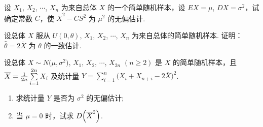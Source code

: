 	\begin{titwo}
		设 $X_{1}$, $X_{2}$, $\cdots$, $X_{n}$ 为来自总体 $X$ 的一个简单随机样本，设 $EX = \mu$, $DX = \sigma^{2}$，试确定常数 $C$，使 $\overline{X}^{2} - CS^{2}$ 为 $\mu^{2}$ 的无偏估计.
	\end{titwo}

	\begin{titwo}
		设总体 $X$ 服从 $U(0,\theta)$, $X_{1}$, $X_{2}$, $\cdots$, $X_{n}$ 为来自总体的简单随机样本. 证明：$\hat \theta = 2 \overline{X}$ 为 $\theta$ 的一致估计.
	\end{titwo}

	\begin{titwo}
		设总体 $X \sim N \bigl( \mu,\sigma^{2} \bigr)$, $X_{1}$, $X_{2}$, $\cdots$, $X_{2n}$ $(n \geq 2)$ 是 $X$ 的简单随机样本，且 $\overline{X} = \frac{1}{2n} \* \sum_{i=1}^{2n} X_{i}$ 及统计量 $Y = \sum_{i=1}^{n} \bigl( X_{i} + X_{n+i} - 2 \overline{X} \bigr)^{2}$.
		\begin{enumerate}
			\item 求统计量 $Y$ 是否为 $\sigma^{2}$ 的无偏估计;
			\item 当 $\mu = 0$ 时，试求 $D \Bigl( \overline{X}^{2} \Bigr)$.
		\end{enumerate}
	\end{titwo}